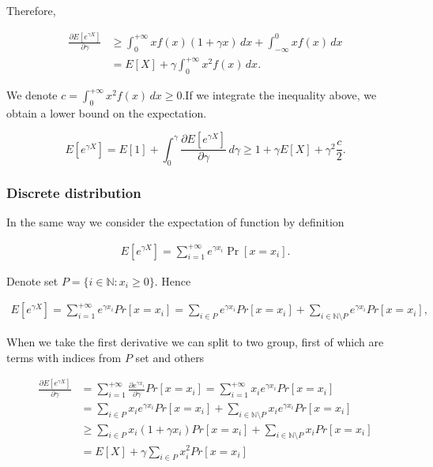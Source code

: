 \documentclass[12pt, a4paper]{article}
\theoremstyle{remark}
\newcommand{\der}[2]{\frac{\partial #1}{\partial #2}}
\begin{document}
Therefore,

\begin{align*}
    \frac{\partial E[e^{\gamma X}]}{\partial \gamma} & \geq  \int_{0}^{+\infty} x f(x) (1 + \gamma x)\, dx + \int_{-\infty}^{0} x f(x)\, dx \\
    & = E[X] + \gamma \int_{0}^{+\infty} x^2 f(x) \, dx.
\end{align*}

We denote $c = \int_{0}^{+\infty} x^2 f(x) \, dx \geq 0$.If we integrate the inequality above, we obtain a lower bound on the expectation.

\[
    E[e^{\gamma X}] = E[1] + \int_0^\gamma \frac{\partial E[e^{\gamma X}]}{\partial \gamma} \, d\gamma \geq 1 + \gamma E[X] + \gamma^2 \frac{c}{2}.
\]

\subsubsection*{Discrete distribution}

In the same way we consider the expectation of function by definition

\begin{align*}
    E[e^{\gamma X}] = \sum_{i = 1}^{+\infty} e^{\gamma x_i} \Pr[x = x_i].
\end{align*}


Denote set $P = \{i \in \mathbb{N}: x_i \geq 0\}$. Hence

\begin{align*}
    E[e^{\gamma X}] = \sum_{i = 1}^{+\infty} e^{\gamma x_i} Pr[x = x_i] = \sum_{i \in P} e^{\gamma x_i} Pr[x = x_i] + \sum_{i \in \mathbb{N}\setminus P} e^{\gamma x_i} Pr[x = x_i],
\end{align*}

When we take the first derivative we can split to two group, first of which are terms with indices from $P$ set and others

\begin{align*}
    \der{E[e^{\gamma X}]}{\gamma} & = \sum_{i = 1}^{+\infty} \frac{\partial e^{\gamma x_i}}{\partial \gamma} Pr[x = x_i] = \sum_{i = 1}^{+\infty} x_i e^{\gamma x_i} Pr[x = x_i] \\
                                  & = \sum_{i \in P} x_i e^{\gamma x_i} Pr[x = x_i] + \sum_{i \in \mathbb{N}\setminus P} x_i e^{\gamma x_i} Pr[x = x_i]                          \\
                                  & \geq \sum_{i \in P} x_i (1 + {\gamma x_i}) Pr[x = x_i] + \sum_{i \in \mathbb{N}\setminus P} x_i Pr[x = x_i]                                  \\
                                  & = E[X] + \gamma\sum_{i \in P} x_i^2 Pr[x = x_i]
\end{align*}
\end{document}
